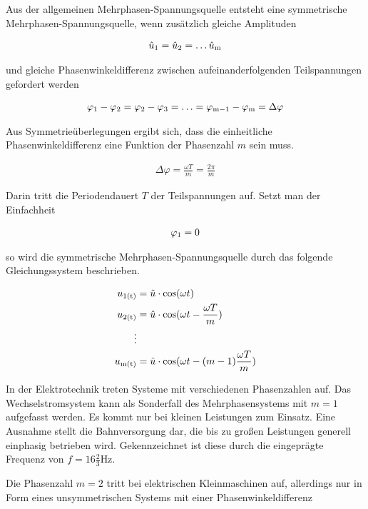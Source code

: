 Aus der allgemeinen Mehrphasen-Spannungsquelle entsteht eine symmetrische Mehrphasen-Spannungsquelle, wenn zusätzlich gleiche Amplituden

\begin{align*}
\hat{u}_{\mathrm{1}} = \hat{u}_{\mathrm{2}} = \ldots \hat{u}_{\mathrm{m}}
\end{align*}

und gleiche Phasenwinkeldifferenz zwischen aufeinanderfolgenden Teilspannungen gefordert werden

\begin{align*}
\varphi_{\mathrm{1}} - \varphi_{\mathrm{2}} = \varphi_{\mathrm{2}} - \varphi_{\mathrm{3}} = \ldots = \varphi_{\mathrm{m-1}} - \varphi_{\mathrm{m}} = \Delta \varphi
\end{align*}

Aus Symmetrieüberlegungen ergibt sich, dass die einheitliche Phasenwinkeldifferenz eine Funktion der Phasenzahl $m$ sein muss.

\begin{align}
\Delta \varphi = \frac{\omega T}{m} = \frac{2\pi}{m}
\end{align}

Darin tritt die Periodendauert $T$ der Teilspannungen auf.
Setzt man der Einfachheit

\begin{align*}
\varphi_{\mathrm{1}} = 0
\end{align*}

so wird die symmetrische Mehrphasen-Spannungsquelle durch das folgende Gleichungssystem beschrieben.

\begin{align}
u_{\mathrm{1(t)}} &= \hat{u} \cdot \cos(\omega t) \\ \label{eqn:drehstrom}
u_{\mathrm{2(t)}} &= \hat{u} \cdot \cos(\omega t - \frac{\omega T}{m})\nonumber \\
\vdots \nonumber \\
u_{\mathrm{m(t)}} &= \hat{u} \cdot \cos(\omega t - (m-1)\frac{\omega T}{m})\nonumber
\end{align}

In der Elektrotechnik treten Systeme mit verschiedenen Phasenzahlen auf.
Das Wechselstromsystem kann als Sonderfall des Mehrphasensystems mit $m=1$ aufgefasst werden.
Es kommt nur bei kleinen Leistungen zum Einsatz.
Eine Ausnahme stellt die Bahnversorgung dar, die bis zu großen Leistungen generell einphasig betrieben wird.
Gekennzeichnet ist diese durch die eingeprägte Frequenz von $f = 16\frac{2}{3}\mbox{Hz}$.

Die Phasenzahl $m=2$ tritt bei elektrischen Kleinmaschinen auf, allerdings nur in Form eines unsymmetrischen Systems mit einer Phasenwinkeldifferenz

